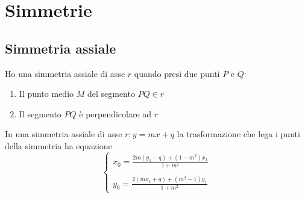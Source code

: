 
\chapter{Simmetrie}
\section{Simmetria assiale}
\begin{defn}\label{defn:Sassiale1}
Ho una simmetria assiale di asse $r$ quando presi due punti $P$ e $Q$:
\begin{enumerate}
	\item Il punto medio $M$ del segmento $PQ\in r$
	\item Il segmento $PQ$ è perpendicolare ad $r$
\end{enumerate} 
\end{defn}
\begin{thm}
In una simmetria assiale di asse $r:y=mx+q$ la trasformazione che lega i punti della simmetria ha equazione
\[\begin{cases}
x_0=\frac{2m(y_1-q)+(1-m^2)x_1}{1+m^2}\\
\\
y_0=\frac{2(mx_1+q)+(m^2-1)y_1}{1+m^2}
\end{cases}\]
\end{thm}
